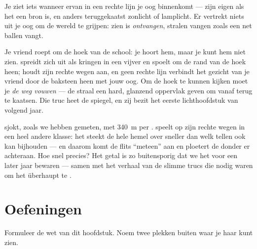 \begin{proposition}\label{prop:g4:light-straight-lines:seeing}
Je ziet iets wanneer  ervan in een rechte lijn je oog binnenkomt
--- zijn eigen  als het een bron is, en anders teruggekaatst
zonlicht of lamplicht. Er vertrekt niets uit je oog om de wereld te
grijpen: zien is \emph{ontvangen}, stralen vangen zoals een net ballen
vangt.
\end{proposition}

\begin{example}[Om de hoek]\label{ex:g4:light-straight-lines:corner}
Je vriend roept om de hoek van de school: je hoort hem, maar je kunt
hem niet zien.  spreidt zich uit als kringen in een vijver en
spoelt om de rand van de hoek heen;  houdt zijn rechte wegen aan,
en geen rechte lijn verbindt het gezicht van je vriend door de
baksteen heen met jouw oog. Om de hoek te kunnen kijken moet je
\emph{de weg vouwen} --- de straal een hard, glanzend oppervlak geven
om vanaf terug te kaatsen. Die truc heet de spiegel, en zij bezit het
eerste lichthoofdstuk van volgend jaar.
\end{example}

\begin{remark}\label{rem:g4:light-straight-lines:speed}
 sjokt, zoals we hebben gemeten, met \qty{340}{m} per .
 speelt op zijn rechte wegen in een heel andere klasse: het
steekt de hele hemel over sneller dan welk tellen ook kan bijhouden
--- en daarom komt de flits ``meteen'' aan en ploetert de donder er
 achteraan. Hoe snel precies? Het getal is zo buitensporig dat
we het voor een later jaar bewaren --- samen met het verhaal van de
slimme trucs die nodig waren om het überhaupt te .
\end{remark}

\section{Oefeningen}

\begin{exercise}[$\star$]\label{exo:g4:light-straight-lines:1}
Formuleer de wet van dit hoofdstuk. Noem twee plekken buiten waar je
haar kunt zien.
\end{exercise}

